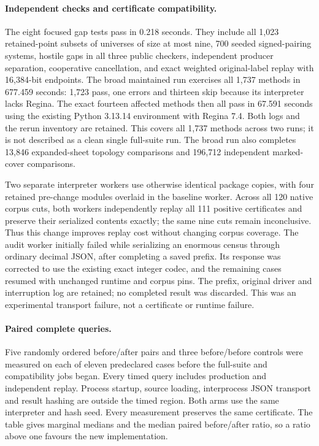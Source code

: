 \paragraph{Independent checks and certificate compatibility.}
The eight focused gap tests pass in 0.218 seconds. They include all 1,023 retained-point
subsets of universes of size at most nine, 700 seeded signed-pairing
systems, hostile gaps in all three public checkers, independent producer
separation, cooperative cancellation, and exact weighted original-label
replay with 16,384-bit endpoints. The broad maintained run exercises all
1,737 methods in 677.459 seconds: 1,723 pass, one errors and thirteen skip
because its interpreter lacks Regina. The exact fourteen affected methods
then all pass in 67.591 seconds using the existing Python 3.13.14 environment
with Regina 7.4. Both logs and the rerun inventory are retained. This covers
all 1,737 methods across two runs; it is not described as a clean single
full-suite run. The broad run also completes 13,846 expanded-sheet topology
comparisons and 196,712 independent marked-cover comparisons.

Two separate interpreter workers use otherwise identical package copies,
with four retained pre-change modules overlaid in the baseline worker.
Across all 120 native corpus cuts, both workers independently replay all
111 positive certificates and preserve their serialized contents exactly;
the same nine cuts remain inconclusive. Thus this change improves replay
cost without changing corpus coverage. The audit worker initially failed
while serializing an enormous census through ordinary decimal JSON, after
completing a saved prefix. Its response was corrected to use the existing
exact integer codec, and the remaining cases resumed with unchanged
runtime and corpus pins. The prefix, original driver and interruption log
are retained; no completed result was discarded. This was an experimental
transport failure, not a certificate or runtime failure.

\paragraph{Paired complete queries.}
Five randomly ordered before/after pairs and three before/before controls
were measured on each of eleven predeclared cases before the full-suite and
compatibility jobs began. Every timed query includes production and
independent replay. Process startup, source loading, interprocess JSON
transport and result hashing are outside the timed region. Both arms use
the same interpreter and hash seed. Every measurement preserves the same
certificate. The table gives marginal medians and the median paired
before/after ratio, so a ratio above one favours the new implementation.

